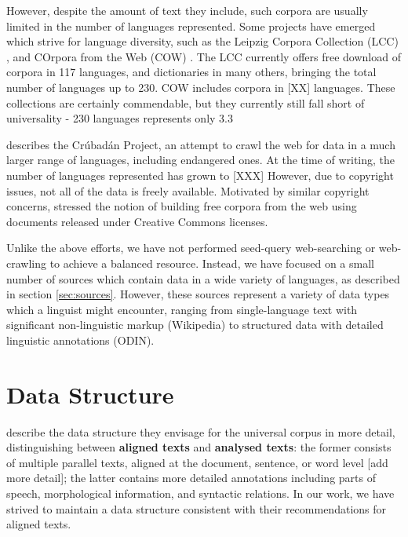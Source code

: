 \documentclass[11pt]{article}
\begin{document}
However, despite the amount of text they include, such corpora are usually limited in the number of languages represented. Some projects have emerged which strive for language diversity, such as the Leipzig Corpora Collection (LCC) \cite{biemann2007leipzig}, and COrpora from the Web (COW) \cite{schaefer2012cow}. The LCC currently offers free download of corpora in 117 languages, and dictionaries in many others, bringing the total number of languages up to 230. COW includes corpora in [XX] languages. These collections are certainly commendable, but they currently still fall short of universality - 230 languages represents only 3.3%

 describes the Crúbadán Project, an attempt to crawl the web for data in a much larger range of languages, including endangered ones. At the time of writing, the number of languages represented has grown to [XXX] However, due to copyright issues, not all of the data is freely available. Motivated by similar copyright concerns,  stressed the notion of building free corpora from the web using documents released under Creative Commons licenses.

Unlike the above efforts, we have not performed seed-query web-searching or web-crawling to achieve a balanced resource. Instead, we have focused on a small number of sources which contain data in a wide variety of languages, as described in section \ref{sec:sources}. However, these sources represent a variety of data types which a linguist might encounter, ranging from single-language text with significant non-linguistic markup (Wikipedia) to structured data with detailed linguistic annotations (ODIN).


\section{Data Structure} \label{sec:structure}

 describe the data structure they envisage for the universal corpus in more detail, distinguishing between \textbf{aligned texts} and \textbf{analysed texts}: the former consists of multiple parallel texts, aligned at the document, sentence, or word level [add more detail]; the latter contains more detailed annotations including parts of speech, morphological information, and syntactic relations. In our work, we have strived to maintain a data structure consistent with their recommendations for aligned texts.
\end{document}
